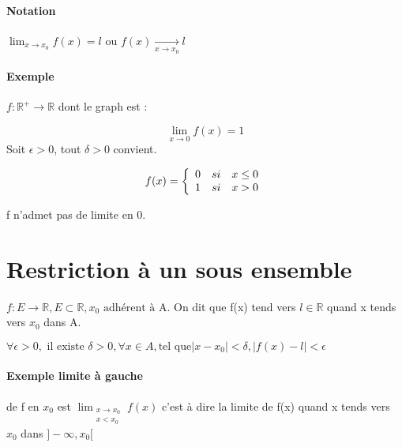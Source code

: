 \paragraph{Notation} $\lim_{x \to x_0} f(x) = l$ ou $f(x) \xrightarrow[x \to x_0]{} l$
\newpage
\paragraph{Exemple} $ f:\mathbb{R}^+ \rightarrow \mathbb{R}$ dont le graph est :


\[ \lim_{x \to 0} f(x) = 1\] Soit $\epsilon > 0$, tout $\delta > 0$ convient.

\begin{wrapfigure}[0]{r}{0pt}
\end{wrapfigure}

\[f(x) = 
\left\{
\begin{array}{r c l}
	0 & si & x \leq 0 \\
	1 & si & x > 0
\end{array}
\right.
\]

f n'admet pas de limite en 0.

\section{Restriction à un sous ensemble}
$f : E \rightarrow \mathbb{R}, E \subset \mathbb{R}, x_0 \text{ adhérent à A.}$
On dit que f(x) tend vers $l \in \mathbb{R}$ quand x tends vers $x_0$ dans A.

$\forall \epsilon > 0, \text{ il existe } \delta > 0, \forall x \in A, \text{tel que} |x-x_0| < \delta, |f(x) - l| < \epsilon$

\paragraph{Exemple limite à gauche} de f en $x_0$ est $\lim_{\substack {x \to x_0 \\ x < x_0}} f(x)$ c'est à dire la limite de f(x) quand x tends vers $x_0$ dans $]-\infty, x_0[$
